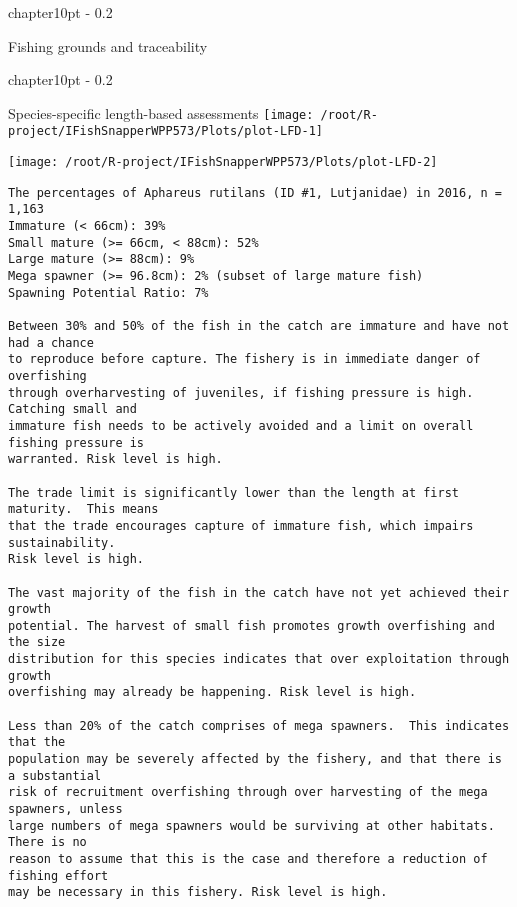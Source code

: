 \documentclass{report}\usepackage[]{graphicx}\usepackage[]{color}
\makeatletter
\def\maxwidth{ %
  \ifdim\Gin@nat@width>\linewidth
    \linewidth
  \else
    \Gin@nat@width
  \fi
}
\newenvironment{kframe}{%
 \def\at@end@of@kframe{}%
 \ifinner\ifhmode%
  \def\at@end@of@kframe{\end{minipage}}%
  \begin{minipage}{\columnwidth}%
 \fi\fi%
 \def\FrameCommand##1{\hskip\@totalleftmargin \hskip-\fboxsep
 \colorbox{shadecolor}{##1}\hskip-\fboxsep
     \hskip-\linewidth \hskip-\@totalleftmargin \hskip\columnwidth}%
 \MakeFramed {\advance\hsize-\width
   \@totalleftmargin\z@ \linewidth\hsize
   \@setminipage}}%
 {\par\unskip\endMakeFramed%
 \at@end@of@kframe}
\newenvironment{knitrout}{}{} %
\newcommand{\verbatimfont}[1]{\def\verbatim@font{#1}}%
\renewcommand\chapter{\@startsection%
{chapter}{1}{0pt}%
{-\baselineskip}%
{0.2\baselineskip}%
{\raggedright\bf}}%
\makeatother
\begin{document}
\newpage

\chapter{Fishing grounds and traceability}


\newpage

\chapter{Species-specific length-based assessments}
\verbatimfont{\normalfont\rmfamily}
\begin{knitrout}
\color{fgcolor}
\texttt{[image: /root/R-project/IFishSnapperWPP573/Plots/plot-LFD-1]} 

\texttt{[image: /root/R-project/IFishSnapperWPP573/Plots/plot-LFD-2]} 
\begin{kframe}\begin{verbatim}
The percentages of Aphareus rutilans (ID #1, Lutjanidae) in 2016, n = 1,163
Immature (< 66cm): 39%
Small mature (>= 66cm, < 88cm): 52%
Large mature (>= 88cm): 9%
Mega spawner (>= 96.8cm): 2% (subset of large mature fish)
Spawning Potential Ratio: 7%
 
Between 30% and 50% of the fish in the catch are immature and have not had a chance
to reproduce before capture. The fishery is in immediate danger of overfishing
through overharvesting of juveniles, if fishing pressure is high.  Catching small and
immature fish needs to be actively avoided and a limit on overall fishing pressure is
warranted. Risk level is high.

The trade limit is significantly lower than the length at first maturity.  This means
that the trade encourages capture of immature fish, which impairs sustainability.
Risk level is high.

The vast majority of the fish in the catch have not yet achieved their growth
potential. The harvest of small fish promotes growth overfishing and the size
distribution for this species indicates that over exploitation through growth
overfishing may already be happening. Risk level is high.

Less than 20% of the catch comprises of mega spawners.  This indicates that the
population may be severely affected by the fishery, and that there is a substantial
risk of recruitment overfishing through over harvesting of the mega spawners, unless
large numbers of mega spawners would be surviving at other habitats. There is no
reason to assume that this is the case and therefore a reduction of fishing effort
may be necessary in this fishery. Risk level is high.
 

\end{verbatim}
\end{kframe}
\end{knitrout}
\end{document}
